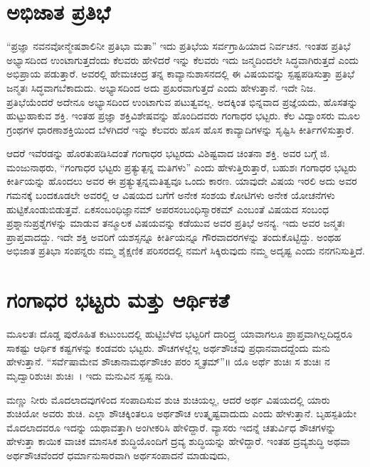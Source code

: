 {\section*{ಅಭಿಜಾತ ಪ್ರತಿಭೆ}  

“ಪ್ರಜ್ಞಾ ನವನವೋನ್ಮೇಷಶಾಲಿನೀ ಪ್ರತಿಭಾ ಮತಾ” ಇದು ಪ್ರತಿಭೆಯ ಸರ್ವಗ್ರಾಹಿಯಾದ ನಿರ್ವಚನ. ಇಂತಹ ಪ್ರತಿಭೆ ಅಭ್ಯಾಸದಿಂದ ಉಂಟಾಗುತ್ತದೆಂದು ಕೆಲವರು ಹೇಳಿದರೆ ಇನ್ನು ಕೆಲವರು ಇದು ಜನ್ಮದಿಂದಲೇ ಸಿದ್ಧವಾಗಿರುತ್ತದೆ ಎಂದು ಅಭಿಪ್ರಾಯ ಪಡುತ್ತಾರೆ. ಅವರಲ್ಲಿ ಹೇಮಚಂದ್ರ ತನ್ನ ಕಾವ್ಯಾನುಶಾಸನದಲ್ಲಿ ಈ ವಿಷಯವನ್ನು ಸ್ಪಷ್ಟಪಡಿಸುತ್ತಾ ಪ್ರತಿಭೆ ಜನ್ಮತಃ ಸಿದ್ಧವಾಗಬೆಕಾದುದು. ಅಭ್ಯಾಸದಿಂದ ಅದು ಪ್ರಖರ\-ವಾಗುತ್ತದೆ ಎಂದು ಹೇಳುತ್ತಾನೆ. ಇದೇ ನಿಜ. ಪ್ರತಿಭೆಯೆಂದರೆ ಅದೇನೂ ಅಭ್ಯಾಸದಿಂದ ಉಂಟಾಗುವ ಪಟುತ್ವವಲ್ಲ. ಅದಕ್ಕಿಂತ ಭಿನ್ನವಾದ ಪ್ರಜ್ಞೆಯದು, ಹೊಸತನ್ನು ಹುಟ್ಟು\-ಹಾಕುವ ಶಕ್ತಿ. ಇಂತಹ ಪ್ರಜ್ಞಾ ಶಕ್ತಿವಿಶೇಷವನ್ನು ಹೊಂದಿದವರು ಗಂಗಾಧರ ಭಟ್ಟರು. ಕೆಲ ವಿದ್ವಾಂಸರು ಮೂಲ ಗ್ರಂಥಗಳ ಧಾರಣಾಶಕ್ತಿಯಿಂದ ಬೆಳಗಿದರೆ ಇನ್ನು ಕೆಲವರು ಹೊಸ ಹೊಸ ಕಾವ್ಯಾದಿಗಳನ್ನು ಸೃಷ್ಟಿಸಿ ಕೀರ್ತಿಗಳಿಸುತ್ತಾರೆ. 

ಆದರೆ ಇವೆರಡನ್ನು ಹೊರತುಪಡಿಸಿದಂತೆ ಗಂಗಾಧರ ಭಟ್ಟರದು ವಿಶಿಷ್ಟವಾದ ಚಿಂತನಾ ಶಕ್ತಿ. ಅವರ ಬಗ್ಗೆ ಜಿ. ಮಂಜುನಾಥರು, “ಗಂಗಾಧರ ಭಟ್ಟರು ಪ್ರತ್ಯುತ್ಪನ್ನ ಮತಿಗಳು” ಎಂದು ಹೇಳುತ್ತಿರುತ್ತಾರೆ, ಬಹುಶಃ ಗಂಗಾಧರ ಭಟ್ಟರು ಕೀರ್ತಿಯನ್ನು ಹೊಂದಲು ಅವರ ಈ ಪ್ರತ್ಯುತ್ಪನ್ನಮತಿತ್ವವೂ ಒಂದು ಕಾರಣ. ಯಾವುದೇ ವಿಷಯ ಇರಲಿ ಅದು ಅವರ ಗಮನಕ್ಕೆ ಬಂದಕೂಡಲೇ ಅವರಲ್ಲಿ ಆ ವಿಷಯದ ಬಗೆಗೆ ಅನೇಕ ಸಂಶಯ ಕೋಟಿಗಳು ಅನೇಕ ಯೋಚನೆಗಳು ಹುಟ್ಟಿಕೊಂಡುಬಿಡುತ್ತವೆ. ಏಕಸಂಬಂಧಿ\-ಜ್ಞಾನಮ್ ಅಪರಸಂಬಂಧಿಸ್ಮಾರಕಮ್ ಎಂಬಂತೆ ವಿಷಯದ ಸಂಬಂಧ ಪ್ರಶ್ನಾನುಪ್ರಶ್ನೆ\-ಗಳನ್ನು ಮಾಡುವ ತನ್ಮೂಲಕ ವಿಷಯವನ್ನು ಕಡೆಯುವ ಅವರ ಪ್ರತಿಭೆ ಅನನ್ಯ. ಇದು ಅವರ ಜನ್ಮತಃ ಪ್ರಾಪ್ತವಾದದ್ದು. ಇದೇ ಶಕ್ತಿ ಅವರಿಗೆ ಯಶಸ್ಸನ್ನೂ ಕೀರ್ತಿಯನ್ನೂ ಗೌರವಾದರಗಳನ್ನು ತಂದುಕೊಟ್ಟಿದ್ದು. ಅಂಥಹ ಅಭಿಜಾತ ಪ್ರತಿಭಾ ಸಂಪನ್ನರು ನಮ್ಮ ಶೈಕ್ಷಣಿಕ ಪರಿಸರದಲ್ಲಿ ನಮಗೆ ಸಿಕ್ಕಿರುವುದು ನಮ್ಮ ಅದೃಷ್ಟ ಎಂದು ನನಗನಿಸುತ್ತಿದೆ.

\section*{ಗಂಗಾಧರ ಭಟ್ಟರು ಮತ್ತು ಆರ್ಥಿಕತೆ}

ಮೂಲತಃ ದೊಡ್ಡ ಪುರೊಹಿತ ಕುಟುಂಬದಲ್ಲಿ ಹುಟ್ಟಿಬೆಳೆದ ಭಟ್ಟರಿಗೆ ದಾರಿದ್ರ್ಯ ಯಾವಾಗಲೂ ಪ್ರಾಪ್ತವಾಗಿಲ್ಲದಿದ್ದರೂ ಸಾಕಷ್ಟು ಆರ್ಥಿಕ ಕಷ್ಟಗಳನ್ನು ಕಂಡವರು ಭಟ್ಟರು. ಶೌಚಗಳಲ್ಲೆಲ್ಲ ಅರ್ಥಶೌಚವು ಪ್ರಧಾನವಾದದ್ದೆಂದು ಮನು ಹೇಳುತ್ತಾನೆ. “ಸರ್ವೆಷಾಮೇವ ಶೌಚಾನಾಮರ್ಥಶೌಚಂ ಪರಂ ಸ್ಮೃತಮ್”॥ ಯೊ ಅರ್ಥೆ ಶುಚಿಃ ಸ ಶುಚಿಃ ನ ಮೃದ್ವಾರಿಶುಚಿಃ ಶುಚಿಃ~। ಇದು ಮನುವಿನ ಸ್ಪಷ್ಟ ನುಡಿ. 

ಮಣ್ಣು ನೀರು ಮೊದಲಾದವುಗಳಿಂದ ಸಂಪಾದಿಸುವ ಶುಚಿ ಶುಚಿಯಲ್ಲ, ಆದರೆ ಅರ್ಥ ವಿಷಯದಲ್ಲಿ ಯಾರು ಶುಚಿಯೋ ಅವರು ಶುಚಿ. ಎಲ್ಲಾ ಶೌಚಕ್ಕಿಂತಲೂ ಅರ್ಥಶೌಚ ಉತ್ಕೃಷ್ಟವಾದುದು ಎಂದು ಹೇಳುತ್ತಾನೆ. ಬೃಹಸ್ಪತಿಯೇ ಮೊದಲಾದವರೂ ಇದನ್ನು ಯಥಾವತ್ತಾಗಿ ಅಂಗೀಕರಿಸಿ ಹೇಳಿದ್ದಾರೆ. ವ್ಯಾಸರು ಇದನ್ನೆ ಚತುರ್ವಿಧ ಶೌಚಗಳನ್ನು ಹೇಳುತ್ತಾ ಕಾಯಿಕ ವಾಚಿಕ ಮಾನಸಿಕ ಶುದ್ಧಿಯೊಂದಿಗೆ ದ್ರವ್ಯ ಶುದ್ಧಿಯನ್ನು ಹೇಳಿದ್ದಾರೆ. ಇಂತಹ ದ್ರವ್ಯಶುದ್ಧಿ ಅಥವಾ ಅರ್ಥಶೌಚವೆಂದರೆ ಧರ್ಮಾನುಸಾರವಾಗಿ ಅರ್ಥಸಂಪಾದನೆ ಮಾಡುವುದು,

}
